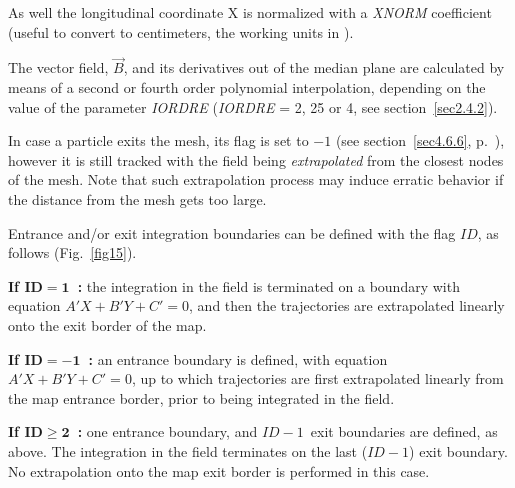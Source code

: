\noindent As well the longitudinal coordinate  X is normalized with 
a  \textsl{XNORM} coefficient (useful to convert to centimeters, the working units in  \zgoubi). 

\noindent The vector field, $ \vec  B $, and its derivatives out of the median
plane are calculated by means of a second or fourth order polynomial 
interpolation, depending on 
the value of the parameter \textsl{IORDRE} (\textsl{IORDRE} = 2, 25 or 4, 
see section~\ref{sec2.4.2}). 
\bigskip

\noindent In case a particle  exits the mesh, its \IEX{} flag is set to $-1$ (see section~\ref{sec4.6.6}, 
p.~\pageref{sec4.6.6}), however it is still tracked with the field being {\it extrapolated} from 
the closest  nodes of the mesh. Note that such extrapolation process may induce erratic behavior if the distance from the mesh gets 
too large. 

\bigskip

\noindent Entrance and/or exit integration boundaries can be defined with 
the flag $ID$, as follows (Fig.~\ref{fig15}).
\bigskip

\noindent \textbf{If  $\mathbf{ID = 1}$~:} the integration in the field 
is terminated on a boundary with equation $A'X + B'Y + C'=0 $, and 
then the trajectories are extrapolated linearly onto the exit border of the map.

\medskip

\noindent \textbf{If  $\mathbf{ID = -1}$~:} an entrance boundary is 
defined, with equation $A'X + B'Y + C'=0 $, up to which  trajectories are 
first extrapolated linearly from the map entrance border, prior to being 
integrated in the field.

\medskip

\noindent \textbf{If  $\mathbf{ID \geq 2}$~:} one entrance boundary, and 
$ID-1$~exit boundaries are defined, as above. The integration in the 
field terminates on the last ($ID - 1$) exit boundary. No extrapolation onto 
the map exit  border is performed in this case.

\newpage

